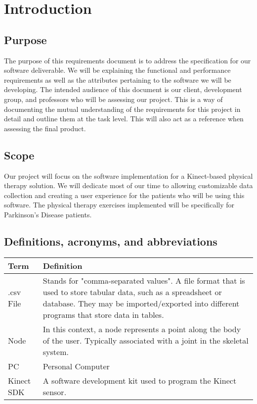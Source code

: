 \documentclass[onecolumn, draftclsnofoot,10pt, compsoc]{IEEEtran}
\begin{document}
\section{Introduction}
\subsection{Purpose}
The purpose of this requirements document is to address the specification for our 
software deliverable. We will be explaining the functional and performance 
requirements as well as the attributes pertaining to the software we will be 
developing. The intended audience of this document is our client, development group, 
and professors who will be assessing our project. This is a way of documenting the 
mutual understanding of the requirements for this project in detail and outline them 
at the task level. This will also act as a reference when assessing the final product.

\subsection{Scope}
Our project will focus on the software implementation for a Kinect-based physical 
therapy solution. We will dedicate most of our time to allowing customizable data 
collection and creating a user experience for the patients who will be using this 
software. The physical therapy exercises implemented will be specifically for 
Parkinson's Disease patients.
\subsection{Definitions, acronyms, and abbreviations}
        \begin{tabu} to 
        \hline
        \textbf{Term} & \textbf{Definition}\\
        \hline
        .csv File & Stands for "comma-separated values". A file format that is used to store tabular data, such as a spreadsheet or database. They may be imported/exported into different programs that store data in tables\cite{csvFile}.\\
        \hline
        Node & In this context, a node represents a point along the body of the user. Typically associated with a joint in the skeletal system\cite{KinectDevelop}.\\
        \hline
        PC & Personal Computer\\
        \hline
        Kinect SDK & A software development kit used to program the Kinect sensor\cite{KinectDevelop}.\\
        \hline
\end{tabu}
\end{document}
